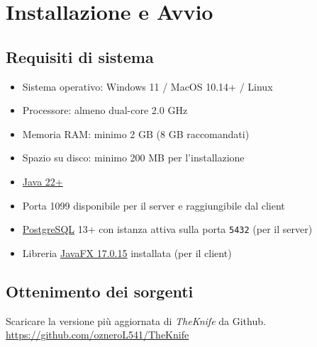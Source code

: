 \section{Installazione e Avvio}
\label{cap:installazione}
\subsection{Requisiti di sistema}
\begin{itemize}
    \item Sistema operativo: Windows 11 / MacOS 10.14+ / Linux
    \item Processore: almeno dual-core 2.0 GHz
    \item Memoria RAM: minimo 2 GB (8 GB raccomandati)
    \item Spazio su disco: minimo 200 MB per l'installazione
    \item \href{www.java.com}{Java 22+}
    \item Porta 1099 disponibile per il server e raggiungibile dal client
    \item \href{www.postgresql.org}{PostgreSQL} 13+ con istanza attiva sulla porta \texttt{5432} (per il server)
    \item Libreria \href{https://gluonhq.com/products/javafx/}{JavaFX 17.0.15} installata (per il client)
\end{itemize}

\subsection{Ottenimento dei sorgenti}
Scaricare la versione più aggiornata di \textit{TheKnife} da Github.\\
\href{https://github.com/ozneroL541/TheKnife}{https://github.com/ozneroL541/TheKnife}

